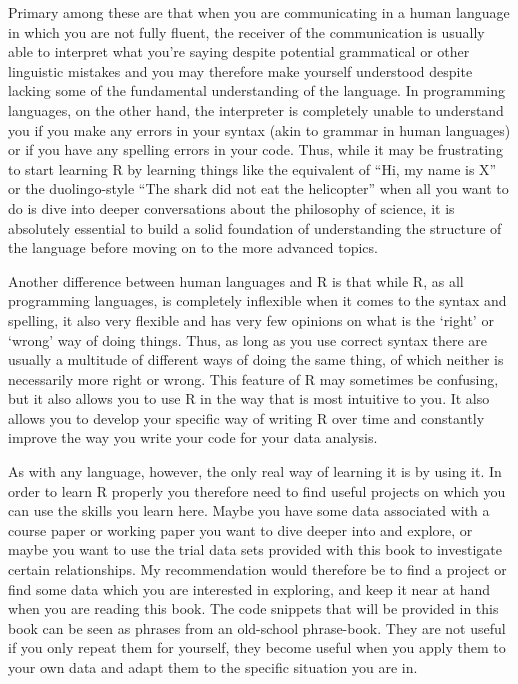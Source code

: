 \documentclass[
]{book}
\begin{document}
Primary among these are that when you are communicating in a human language in which you are not fully fluent, the receiver of the communication is usually able to interpret what you're saying despite potential grammatical or other linguistic mistakes and you may therefore make yourself understood despite lacking some of the fundamental understanding of the language. In programming languages, on the other hand, the interpreter is completely unable to understand you if you make any errors in your syntax (akin to grammar in human languages) or if you have any spelling errors in your code. Thus, while it may be frustrating to start learning R by learning things like the equivalent of ``Hi, my name is X'' or the duolingo-style ``The shark did not eat the helicopter'' when all you want to do is dive into deeper conversations about the philosophy of science, it is absolutely essential to build a solid foundation of understanding the structure of the language before moving on to the more advanced topics.

Another difference between human languages and R is that while R, as all programming languages, is completely inflexible when it comes to the syntax and spelling, it also very flexible and has very few opinions on what is the `right' or `wrong' way of doing things. Thus, as long as you use correct syntax there are usually a multitude of different ways of doing the same thing, of which neither is necessarily more right or wrong. This feature of R may sometimes be confusing, but it also allows you to use R in the way that is most intuitive to you. It also allows you to develop your specific way of writing R over time and constantly improve the way you write your code for your data analysis.

As with any language, however, the only real way of learning it is by using it. In order to learn R properly you therefore need to find useful projects on which you can use the skills you learn here. Maybe you have some data associated with a course paper or working paper you want to dive deeper into and explore, or maybe you want to use the trial data sets provided with this book to investigate certain relationships. My recommendation would therefore be to find a project or find some data which you are interested in exploring, and keep it near at hand when you are reading this book. The code snippets that will be provided in this book can be seen as phrases from an old-school phrase-book. They are not useful if you only repeat them for yourself, they become useful when you apply them to your own data and adapt them to the specific situation you are in.
\end{document}
